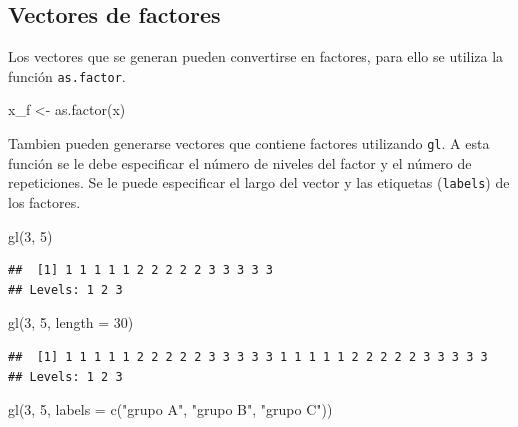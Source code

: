 \documentclass[
]{book}
\newenvironment{Shaded}{\begin{snugshade}}{\end{snugshade}}
\newcommand{\AttributeTok}[1]{\textcolor[rgb]{0.77,0.63,0.00}{#1}}
\newcommand{\DecValTok}[1]{\textcolor[rgb]{0.00,0.00,0.81}{#1}}
\newcommand{\FunctionTok}[1]{\textcolor[rgb]{0.00,0.00,0.00}{#1}}
\newcommand{\NormalTok}[1]{#1}
\newcommand{\OtherTok}[1]{\textcolor[rgb]{0.56,0.35,0.01}{#1}}
\newcommand{\StringTok}[1]{\textcolor[rgb]{0.31,0.60,0.02}{#1}}
\begin{document}
\hypertarget{vectores-de-factores}{%
\subsection{Vectores de factores}\label{vectores-de-factores}}

Los vectores que se generan pueden convertirse en factores, para ello se utiliza la función \texttt{as.factor}.

\begin{Shaded}
\begin{Highlighting}[]
\NormalTok{x\_f }\OtherTok{\textless{}{-}} \FunctionTok{as.factor}\NormalTok{(x)}
\end{Highlighting}
\end{Shaded}

Tambien pueden generarse vectores que contiene factores utilizando \texttt{gl}. A esta función se le debe especificar el número de niveles del factor y el número de repeticiones. Se le puede especificar el largo del vector y las etiquetas (\texttt{labels}) de los factores.

\begin{Shaded}
\begin{Highlighting}[]
\FunctionTok{gl}\NormalTok{(}\DecValTok{3}\NormalTok{, }\DecValTok{5}\NormalTok{)}
\end{Highlighting}
\end{Shaded}

\begin{verbatim}
##  [1] 1 1 1 1 1 2 2 2 2 2 3 3 3 3 3
## Levels: 1 2 3
\end{verbatim}

\begin{Shaded}
\begin{Highlighting}[]
\FunctionTok{gl}\NormalTok{(}\DecValTok{3}\NormalTok{, }\DecValTok{5}\NormalTok{, }\AttributeTok{length =} \DecValTok{30}\NormalTok{)}
\end{Highlighting}
\end{Shaded}

\begin{verbatim}
##  [1] 1 1 1 1 1 2 2 2 2 2 3 3 3 3 3 1 1 1 1 1 2 2 2 2 2 3 3 3 3 3
## Levels: 1 2 3
\end{verbatim}

\begin{Shaded}
\begin{Highlighting}[]
\FunctionTok{gl}\NormalTok{(}\DecValTok{3}\NormalTok{, }\DecValTok{5}\NormalTok{, }\AttributeTok{labels =} \FunctionTok{c}\NormalTok{(}\StringTok{"grupo A"}\NormalTok{, }\StringTok{"grupo B"}\NormalTok{, }\StringTok{"grupo C"}\NormalTok{))}
\end{Highlighting}
\end{Shaded}
\end{document}
